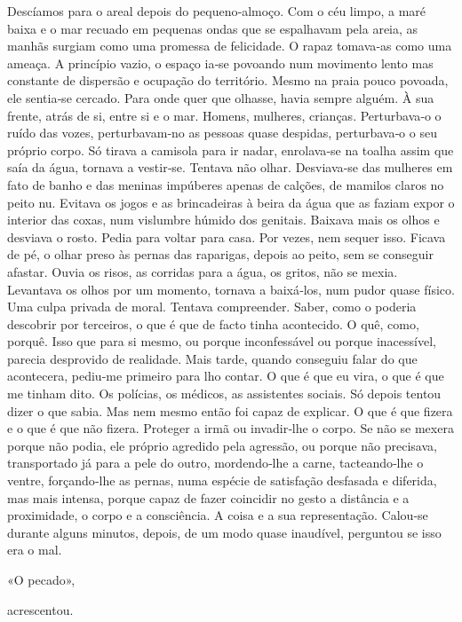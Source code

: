Descíamos para o areal depois do pequeno­‑almoço. Com o céu limpo, a
maré baixa e o mar recuado em pequenas ondas que se espalhavam pela
areia, as manhãs surgiam como uma promessa de felicidade. O rapaz
tomava­‑as como uma ameaça. A princípio vazio, o espaço ia­‑se povoando
num movimento lento mas constante de dispersão e ocupação do território.
Mesmo na praia pouco povoada, ele sentia­‑se cercado. Para onde quer que
olhasse, havia sempre alguém. À sua frente, atrás de si, entre si e o
mar. Homens, mulheres, crianças. Perturbava­‑o o ruído das vozes,
perturbavam­‑no as pessoas quase despidas, perturbava­‑o o seu próprio
corpo. Só tirava a camisola para ir nadar, enrolava­‑se na toalha assim
que saía da água, tornava a vestir­‑se. Tentava não olhar. Desviava­‑se
das mulheres em fato de banho e das meninas impúberes apenas de calções,
de mamilos claros no peito nu. Evitava os jogos e as brincadeiras à
beira da água que as faziam expor o interior das coxas, num vislumbre
húmido dos genitais. Baixava mais os olhos e desviava o rosto. Pedia
para voltar para casa. Por vezes, nem sequer isso. Ficava de pé, o olhar
preso às pernas das raparigas, depois ao peito, sem se conseguir
afastar. Ouvia os risos, as corridas para a água, os gritos, não se
mexia. Levantava os olhos por um momento, tornava a baixá­‑los, num
pudor quase físico. Uma culpa privada de moral. Tentava compreender.
Saber, como o poderia descobrir por terceiros, o que é que de facto
tinha acontecido. O quê, como, porquê. Isso que para si mesmo, ou porque
inconfessável ou porque inacessível, parecia desprovido de realidade.
Mais tarde, quando conseguiu falar do que acontecera, pediu­‑me primeiro
para lho contar. O que é que eu vira, o que é que me tinham dito. Os
polícias, os médicos, as assistentes sociais. Só depois tentou dizer o
que sabia. Mas nem mesmo então foi capaz de explicar. O que é que fizera
e o que é que não fizera. Proteger a irmã ou invadir­‑lhe o corpo. Se
não se mexera porque não podia, ele próprio agredido pela agressão, ou
porque não precisava, transportado já para a pele do outro,
mordendo­‑lhe a carne, tacteando­‑lhe o ventre, forçando­‑lhe as pernas,
numa espécie de satisfação desfasada e diferida, mas mais intensa,
porque capaz de fazer coincidir no gesto a distância e a proximidade, o
corpo e a consciência. A coisa e a sua representação. Calou­‑se durante
alguns minutos, depois, de um modo quase inaudível, perguntou se isso
era o mal.

«O pecado»,

acrescentou.

